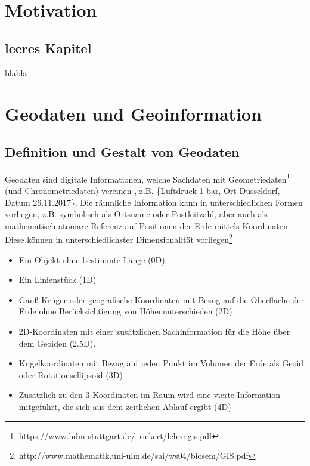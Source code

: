 \documentclass[11pt,fleqn]{book}
\begin{document}
\chapter{Motivation}
\section{leeres Kapitel}
blabla

\chapter{Geodaten und Geoinformation}
\section{Definition und Gestalt von Geodaten}
Geodaten sind digitale Informationen, welche Sachdaten mit Geometriedaten\footnote{https://www.hdm-stuttgart.de/~riekert/lehre gis.pdf} (und Chronometriedaten) vereinen , z.B. \{Luftdruck 1 bar, Ort Düsseldorf, Datum 26.11.2017\}. 
Die räumliche Information kann in unterschiedlichen Formen vorliegen, z.B. symbolisch als Ortsname oder Postleitzahl, aber auch als mathematisch atomare Referenz auf Positionen der Erde mittels Koordinaten. Diese können in unterschiedlichster Dimensionalität vorliegen\footnote{http://www.mathematik.uni-ulm.de/sai/ws04/biosem/GIS.pdf}
\begin{itemize}
\item Ein Objekt ohne bestimmte Länge (0D)
\item Ein Linienstück (1D)
\item
Gauß-Krüger oder geografische Koordinaten mit Bezug auf die Oberfläche der Erde ohne Berücksichtigung von Höhenunterschieden (2D)
\item 
2D-Koordinaten mit einer zusätzlichen Sachinformation für die Höhe über dem Geoiden (2.5D).
\item Kugelkoordinaten mit Bezug auf jeden Punkt im Volumen der Erde als
Geoid oder Rotationsellipsoid (3D)
\item 
Zusätzlich zu den 3 Koordinaten im Raum wird eine vierte
Information mitgeführt, die sich aus dem zeitlichen Ablauf ergibt (4D)
\end{itemize}


\newpage
\end{document}
